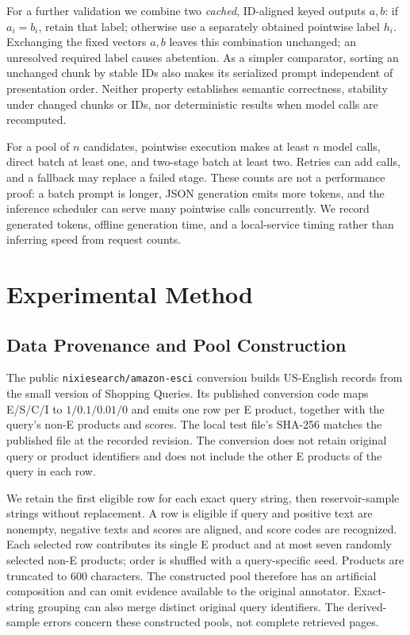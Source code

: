 \documentclass[conference]{IEEEtran}
\begin{document}
For a further validation we combine two \emph{cached}, ID-aligned keyed outputs $a,b$: if $a_i=b_i$, retain that label; otherwise use a separately obtained pointwise label $h_i$. Exchanging the fixed vectors $a,b$ leaves this combination unchanged; an unresolved required label causes abstention. As a simpler comparator, sorting an unchanged chunk by stable IDs also makes its serialized prompt independent of presentation order. Neither property establishes semantic correctness, stability under changed chunks or IDs, nor deterministic results when model calls are recomputed.

For a pool of $n$ candidates, pointwise execution makes at least $n$ model calls, direct batch at least one, and two-stage batch at least two. Retries can add calls, and a fallback may replace a failed stage. These counts are not a performance proof: a batch prompt is longer, JSON generation emits more tokens, and the inference scheduler can serve many pointwise calls concurrently. We record generated tokens, offline generation time, and a local-service timing rather than inferring speed from request counts.

\section{Experimental Method}
\subsection{Data Provenance and Pool Construction}
The public \texttt{nixiesearch/amazon-esci} conversion \cite{derived} builds US-English records from the small version of Shopping Queries. Its published conversion code maps E/S/C/I to $1/0.1/0.01/0$ and emits one row per E product, together with the query's non-E products and scores. The local test file's SHA-256 matches the published file at the recorded revision. The conversion does not retain original query or product identifiers and does not include the other E products of the query in each row.

We retain the first eligible row for each exact query string, then reservoir-sample strings without replacement. A row is eligible if query and positive text are nonempty, negative texts and scores are aligned, and score codes are recognized. Each selected row contributes its single E product and at most seven randomly selected non-E products; order is shuffled with a query-specific seed. Products are truncated to 600 characters. The constructed pool therefore has an artificial composition and can omit evidence available to the original annotator. Exact-string grouping can also merge distinct original query identifiers. The derived-sample errors concern these constructed pools, not complete retrieved pages.
\end{document}
